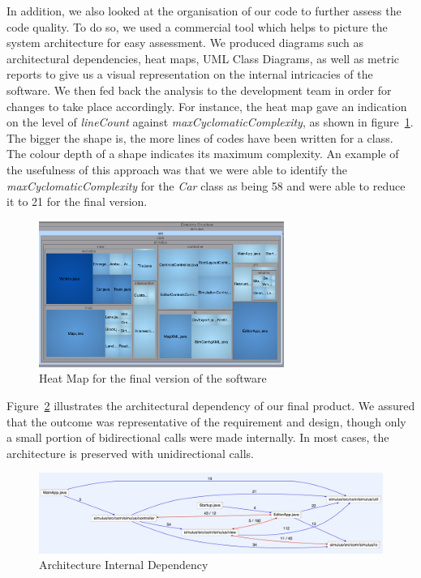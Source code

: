 In addition, we also looked at the organisation of our code to further assess the code quality. To do so, we used a commercial tool which helps to picture the system architecture for easy assessment. We produced diagrams such as architectural dependencies, heat maps, UML Class Diagrams, as well as metric reports to give us a visual representation on the internal intricacies of the software. We then fed back the analysis to the development team in order for changes to take place accordingly. For instance, the heat map gave an indication on the level of \textit{lineCount} against \textit{maxCyclomaticComplexity}, as shown in figure~\ref{fig:heatmap}. The bigger the shape is, the more lines of codes have been written for a class. The colour depth of a shape indicates its maximum complexity. An example of the usefulness of this approach was that we were able to identify the \textit{maxCyclomaticComplexity} for the \textit{Car} class as being 58 and were able to reduce it to 21 for the final version.     

\begin{figure}[h]
        \begin{minipage}{\textwidth}
                \begin{center}
                                \includegraphics[width=80mm,keepaspectratio ]{img/heatmap.png}
                        \caption{Heat Map for the final version of the software}
                        \label{fig:heatmap}     
                \end{center}
        \end{minipage}
\end{figure}

Figure~\ref{fig:archIntDependency} illustrates the architectural dependency of our final product. We assured that the outcome was representative of the requirement and design, though only a small portion of bidirectional calls were made internally. In most cases, the architecture is preserved with unidirectional calls.

\begin{figure}[h]
        \begin{center}
             \includegraphics[width=\textwidth]{img/archIntDependency.png}
        \caption{Architecture Internal Dependency}
        \label{fig:archIntDependency}
        \end{center}
\end{figure}



\clearpage